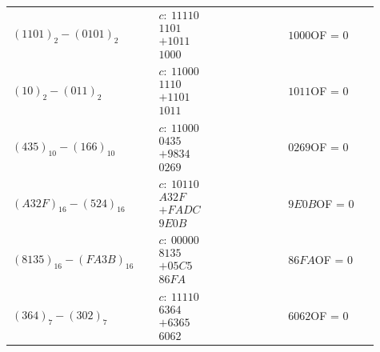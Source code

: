 \documentclass[a4paper,11pt]{article}
\numberwithin{equation}{section}
\newcommand{\redlinija}{\arrayrulecolor{black!28}\specialrule{0.3pt}{2pt}{2pt}\arrayrulecolor{black}}
\begin{document}
\begin{longtable}{p{0.34\linewidth} p{0.34\linewidth} p{0.23\linewidth}}
\redlinija
$(1101)_{2}-(0101)_{2}$ & $\begin{array}{r}c:\ 11110\\1101\\+1011\\\hline 1000\end{array}$ & $1000$\newline OF = 0\\[5pt]
\redlinija
$(10)_{2}-(011)_{2}$ & $\begin{array}{r}c:\ 11000\\1110\\+1101\\\hline 1011\end{array}$ & $1011$\newline OF = 0\\[5pt]
\redlinija
$(435)_{10}-(166)_{10}$ & $\begin{array}{r}c:\ 11000\\0435\\+9834\\\hline 0269\end{array}$ & $0269$\newline OF = 0\\[5pt]
\redlinija
$(A32F)_{16}-(524)_{16}$ & $\begin{array}{r}c:\ 10110\\A32F\\+FADC\\\hline 9E0B\end{array}$ & $9E0B$\newline OF = 0\\[5pt]
\redlinija
$(8135)_{16}-(FA3B)_{16}$ & $\begin{array}{r}c:\ 00000\\8135\\+05C5\\\hline 86FA\end{array}$ & $86FA$\newline OF = 0\\[5pt]
\redlinija
$(364)_{7}-(302)_{7}$ & $\begin{array}{r}c:\ 11110\\6364\\+6365\\\hline 6062\end{array}$ & $6062$\newline OF = 0\\[5pt]
\bottomrule\end{longtable}


\FloatBarrier
\end{document}
